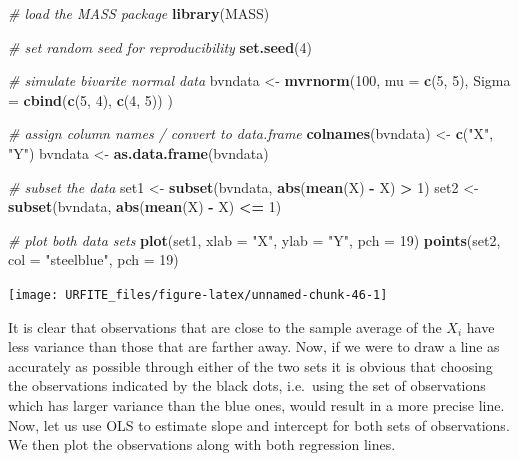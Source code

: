\documentclass[]{book}
\newenvironment{Shaded}{\begin{snugshade}}{\end{snugshade}}
\newcommand{\KeywordTok}[1]{\textcolor[rgb]{0.13,0.29,0.53}{\textbf{#1}}}
\newcommand{\DataTypeTok}[1]{\textcolor[rgb]{0.13,0.29,0.53}{#1}}
\newcommand{\DecValTok}[1]{\textcolor[rgb]{0.00,0.00,0.81}{#1}}
\newcommand{\StringTok}[1]{\textcolor[rgb]{0.31,0.60,0.02}{#1}}
\newcommand{\CommentTok}[1]{\textcolor[rgb]{0.56,0.35,0.01}{\textit{#1}}}
\newcommand{\OperatorTok}[1]{\textcolor[rgb]{0.81,0.36,0.00}{\textbf{#1}}}
\newcommand{\NormalTok}[1]{#1}
\theoremstyle{definition}
\theoremstyle{definition}
\theoremstyle{definition}
\theoremstyle{remark}
\begin{document}
\begin{Shaded}
\begin{Highlighting}[]
\CommentTok{# load the MASS package}
\KeywordTok{library}\NormalTok{(MASS)}

\CommentTok{# set random seed for reproducibility}
\KeywordTok{set.seed}\NormalTok{(}\DecValTok{4}\NormalTok{)}

\CommentTok{# simulate bivarite normal data}
\NormalTok{bvndata <-}\StringTok{ }\KeywordTok{mvrnorm}\NormalTok{(}\DecValTok{100}\NormalTok{, }
                \DataTypeTok{mu =} \KeywordTok{c}\NormalTok{(}\DecValTok{5}\NormalTok{, }\DecValTok{5}\NormalTok{), }
                \DataTypeTok{Sigma =} \KeywordTok{cbind}\NormalTok{(}\KeywordTok{c}\NormalTok{(}\DecValTok{5}\NormalTok{, }\DecValTok{4}\NormalTok{), }\KeywordTok{c}\NormalTok{(}\DecValTok{4}\NormalTok{, }\DecValTok{5}\NormalTok{))}
\NormalTok{                ) }

\CommentTok{# assign column names / convert to data.frame}
\KeywordTok{colnames}\NormalTok{(bvndata) <-}\StringTok{ }\KeywordTok{c}\NormalTok{(}\StringTok{"X"}\NormalTok{, }\StringTok{"Y"}\NormalTok{)}
\NormalTok{bvndata <-}\StringTok{ }\KeywordTok{as.data.frame}\NormalTok{(bvndata)}

\CommentTok{# subset the data}
\NormalTok{set1 <-}\StringTok{ }\KeywordTok{subset}\NormalTok{(bvndata, }\KeywordTok{abs}\NormalTok{(}\KeywordTok{mean}\NormalTok{(X) }\OperatorTok{-}\StringTok{ }\NormalTok{X) }\OperatorTok{>}\StringTok{ }\DecValTok{1}\NormalTok{)}
\NormalTok{set2 <-}\StringTok{ }\KeywordTok{subset}\NormalTok{(bvndata, }\KeywordTok{abs}\NormalTok{(}\KeywordTok{mean}\NormalTok{(X) }\OperatorTok{-}\StringTok{ }\NormalTok{X) }\OperatorTok{<=}\StringTok{ }\DecValTok{1}\NormalTok{)}

\CommentTok{# plot both data sets}
\KeywordTok{plot}\NormalTok{(set1, }\DataTypeTok{xlab =} \StringTok{"X"}\NormalTok{, }\DataTypeTok{ylab =} \StringTok{"Y"}\NormalTok{, }\DataTypeTok{pch =} \DecValTok{19}\NormalTok{)}
\KeywordTok{points}\NormalTok{(set2, }\DataTypeTok{col =} \StringTok{"steelblue"}\NormalTok{, }\DataTypeTok{pch =} \DecValTok{19}\NormalTok{)}
\end{Highlighting}
\end{Shaded}

\begin{center}\texttt{[image: URFITE\_files/figure-latex/unnamed-chunk-46-1]} \end{center}

It is clear that observations that are close to the sample average of
the \(X_i\) have less variance than those that are farther away. Now, if
we were to draw a line as accurately as possible through either of the
two sets it is obvious that choosing the observations indicated by the
black dots, i.e.~using the set of observations which has larger variance
than the blue ones, would result in a more precise line. Now, let us use
OLS to estimate slope and intercept for both sets of observations. We
then plot the observations along with both regression lines.
\end{document}
